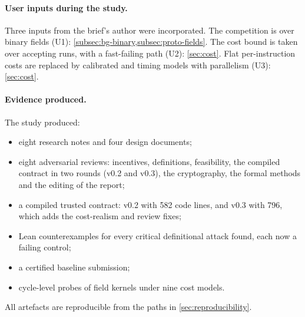 \paragraph{User inputs during the study.} Three inputs from the brief's author were incorporated. The
competition is over binary fields (U1): \cref{subsec:bg-binary,subsec:proto-fields}. The cost bound is
taken over accepting runs, with a fast-failing path (U2): \cref{sec:cost}. Flat per-instruction costs
are replaced by calibrated and timing models with parallelism (U3): \cref{sec:cost}.

\paragraph{Evidence produced.} The study produced:
\begin{itemize}[nosep]
\item eight research notes and four design documents;
\item eight adversarial reviews: incentives, definitions, feasibility, the compiled contract in two
  rounds (v0.2 and v0.3), the cryptography, the formal methods and the editing of the report;
\item a compiled trusted contract: v0.2 with 582 code lines, and v0.3 with 796, which adds the
  cost-realism and review fixes;
\item Lean counterexamples for every critical definitional attack found, each now a failing control;
\item a certified baseline submission;
\item cycle-level probes of field kernels under nine cost models.
\end{itemize}
All artefacts are reproducible from the paths in \cref{sec:reproducibility}.

